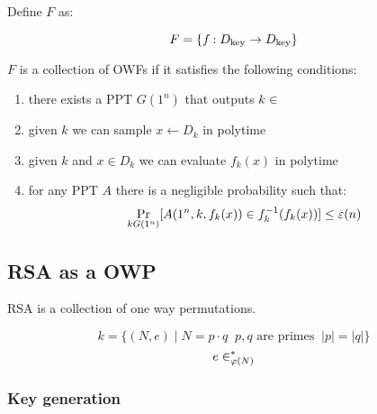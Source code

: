 \documentclass{idc_msc}
\let\Keyspace\relax
\newcommand{\Keyspace}{\texorpdfstring{\ensuremath{\mathcal{K}}}{K}}
\let\getsrandom\relax
\newcommand{\getsrandom}{\ensuremath{\overset{R}{\gets}}}
\let\ints\relax
\newcommand{\ints}{\ensuremath{\mathbb{Z}}}
\let\negligible\relax
\DeclareMathOperator*{\negligible}{\mathrm{neg}}
\begin{document}
Define \(F\) as:

\[
  F = \{f_{\negligible} : D_{\mathrm{key}} \to D_{\mathrm{key}}\}
\]

\(F\) is a collection of OWFs if it satisfies the following conditions:

\begin{enumerate}
  \item there exists a PPT \(G(1^n)\) that outputs \(k \in \Keyspace\)
  \item given \(k\) we can sample \(x \gets D_{k}\) in polytime
  \item given \(k\) and \(x \in D_{k}\) we can evaluate \(f_{k}(x)\) in polytime
  \item for any PPT \(A\) there is a negligible probability such that:
  \[
    \Pr_{k \getsrandom G(1^n)}[A(1^n, k, f_k(x)) \in f^{-1}_k (f_k(x))] \le \varepsilon(n)
  \]
\end{enumerate}

\subsection{RSA as a OWP}

RSA is a collection of one way permutations.

\[
  k = \{(N, e) \mid N = p \cdot q \;\; p, q \text{ are primes} \;\; |p| = |q| \}
\]
\[
  e \in \ints_{\varphi(N)}^*
\]

\subsubsection{Key generation}

\end{document}

